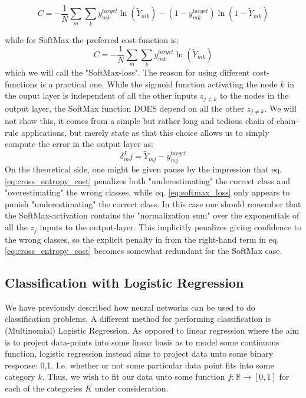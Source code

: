 \documentclass[reprint, english, nofootinbib]{revtex4-2}
\begin{document}
\begin{equation}
\label{eq:cross_entropy_cost}
C= - \frac{1}{N} \sum_m \sum_k y^{target}_{mk}  \ln (\tilde{Y}_{mk}) - (1-y^{target}_{mk})  \ln (1- \tilde{Y}_{mk})
\end{equation}

while for SoftMax the preferred cost-function is:
\begin{equation}
\label{eq:softmax_loss}
C= - \frac{1}{N} \sum_m \sum_k y^{target}_{mk}  \ln (\tilde{Y}_{mk})
\end{equation}
which we will call the "SoftMax-loss". The reason for using different cost-functions is a practical one. While the sigmoid function activating the node $k$ in the ouput layer is independent of all the other inputs $z_{j\neq k}$ to the nodes in the output layer, the SoftMax function DOES depend on all the other $z_{j\neq k}$. We will not show this, it comes from a simple but rather long and tedious chain of chain-rule applications, but merely state as \cite{Nielsen} that this choice allows us to simply compute the error in the output layer as:
\begin{equation}
\label{eq:output_error_nn_classifier}
\delta^L_mj = \tilde{Y}_{mj} - y^{target}_{mj}
\end{equation}
On the theoretical side, one might be given pause by the impression that eq. \ref{eq:cross_entropy_cost} penalizes both "underestimating" the correct class and "overestimating" the wrong classes, while eq. \ref{eq:softmax_loss} only appears to punish "underestimating" the correct class. In this case one should remember that the SoftMax-activation contains the "normalization sum" over the exponentials of all the $z_j$ inputs to the output-layer. This implicitly penalizes giving confidence to the wrong classes, so the explicit penalty in from the right-hand term in eq.\ref{eq:cross_entropy_cost} becomes somewhat redundant for the SoftMax case.


\subsection{Classification with Logistic Regression}
\noindent

We have previously described how neural networks can be used to do classification problems. A different method for performing classification is (Multinomial) Logistic Regression. As opposed to linear regression where the aim is to project data-points into some linear basis as to model some continuous function, logistic regression instead aims to project data unto some binary response: 0,1. I.e. whether or not some particular data point fits into some category $k$. Thus, we wish to fit our data unto some function $f : \mathbb R \rightarrow [0, 1]$ for each of the categories $K$ under consideration.
\end{document}
